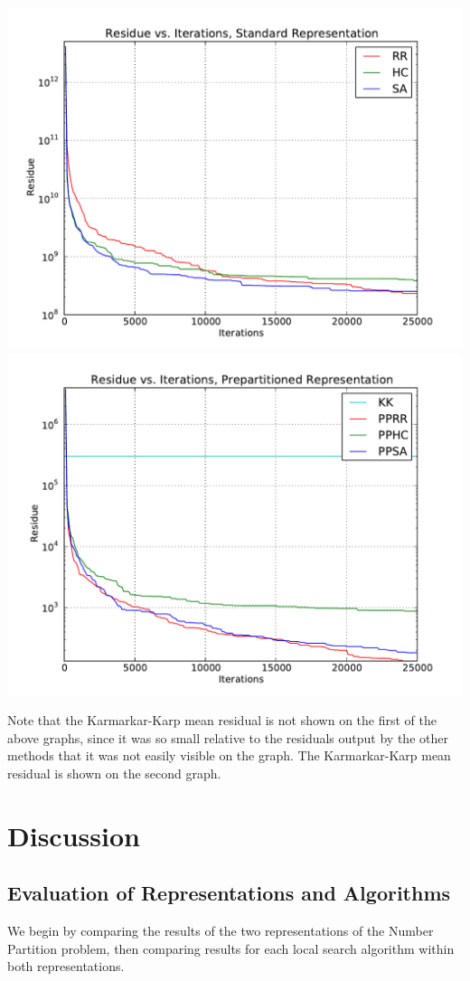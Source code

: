 \documentclass[solution, letterpaper]{cs121}
\begin{document}
\begin{center}
\includegraphics[scale=0.72]{residue-v-iteration-standard.pdf}
\includegraphics[scale=0.72]{residue-v-iteration-prepartition.pdf}
\end{center}
Note that the Karmarkar-Karp mean residual is not shown on the first of the above graphs, since it was so small relative to the residuals output by the other methods that it was not easily visible on the graph. The Karmarkar-Karp mean residual is shown on the second graph.

\section*{Discussion}
\subsection*{Evaluation of Representations and Algorithms}
\hspace{4mm} We begin by comparing the results of the two representations of the Number Partition problem, then comparing results for each local search algorithm within both representations.
\end{document}

